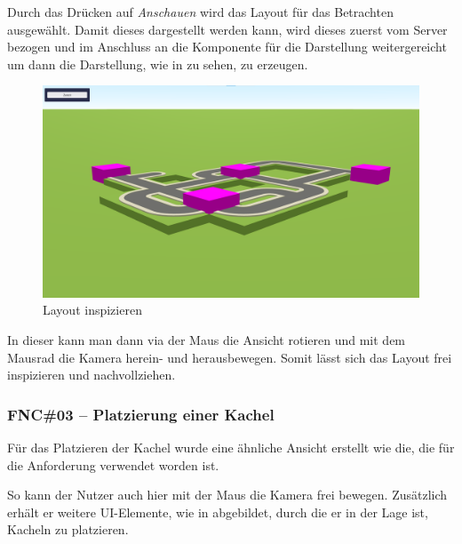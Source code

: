 Durch das Drücken auf \textit{Anschauen} wird das Layout für das Betrachten ausgewählt.
Damit dieses dargestellt werden kann, wird dieses zuerst vom Server bezogen und im Anschluss an die Komponente für die Darstellung weitergereicht um dann die Darstellung, wie in  zu sehen, zu erzeugen.

\begin{figure}[htb]
    \centering
    \includegraphics[scale=.25,center]{medien/screenshots/layout-view.png}
    \caption{Layout inspizieren}
    \ownsource
    \label{fig:layout-view}
\end{figure}

In dieser kann man dann via der Maus die Ansicht rotieren und mit dem Mausrad die Kamera herein- und herausbewegen.
Somit lässt sich das Layout frei inspizieren und nachvollziehen.


\subsubsection{FNC\#03 – Platzierung einer Kachel} \label{sec:check-fnc-3}

Für das Platzieren der Kachel wurde eine ähnliche Ansicht erstellt wie die, die für die Anforderung  verwendet worden ist.

So kann der Nutzer auch hier mit der Maus die Kamera frei bewegen.
Zusätzlich erhält er weitere UI-Elemente, wie in  abgebildet, durch die er in der Lage ist, Kacheln zu platzieren.

